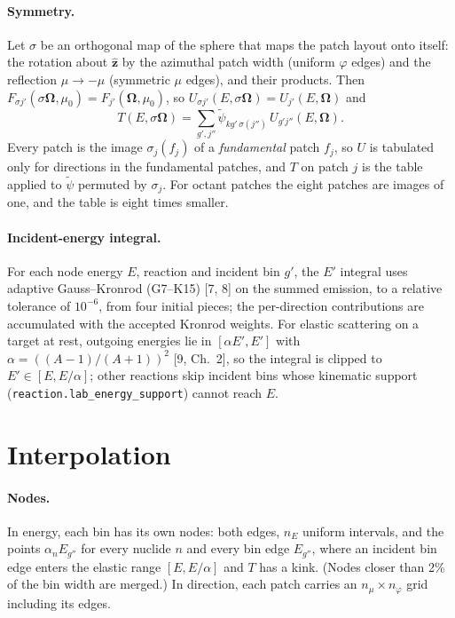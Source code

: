 \documentclass[11pt]{article}
\newcommand{\tpsi}{\tilde\psi}
\newcommand{\Om}{\boldsymbol\Omega}
\begin{document}
\paragraph{Symmetry.} Let $\sigma$ be an orthogonal map of the sphere that maps the
patch layout onto itself: the rotation about $\hat{\mathbf z}$ by the azimuthal patch
width (uniform $\varphi$ edges) and the reflection $\mu\to-\mu$ (symmetric $\mu$
edges), and their products. Then $F_{\sigma j'}(\sigma\Om,\mu_0) = F_{j'}(\Om,\mu_0)$,
so $U_{\sigma j'}(E,\sigma\Om) = U_{j'}(E,\Om)$ and
\begin{equation}
  T(E,\sigma\Om) = \sum_{g',j''} \tpsi_{kg'\,\sigma(j'')}\, U_{g'j''}(E,\Om).
\end{equation}
Every patch is the image $\sigma_j(f_j)$ of a \emph{fundamental} patch $f_j$, so $U$
is tabulated only for directions in the fundamental patches, and $T$ on patch $j$ is
the table applied to $\tpsi$ permuted by $\sigma_j$. For octant patches the eight
patches are images of one, and the table is eight times smaller.

\paragraph{Incident-energy integral.} For each node energy $E$, reaction and incident
bin $g'$, the $E'$ integral uses adaptive Gauss--Kronrod (G7--K15) [7, 8] on the
summed emission, to a relative tolerance of $10^{-6}$, from four initial pieces;
the per-direction contributions are accumulated with the accepted Kronrod weights.
For elastic scattering on a target at rest, outgoing energies lie in $[\alpha E',E']$
with $\alpha = ((A-1)/(A+1))^2$ [9, Ch.~2], so the integral is clipped to
$E'\in[E, E/\alpha]$; other reactions skip incident bins whose kinematic support
(\texttt{reaction.lab\_energy\_support}) cannot reach $E$.

\section{Interpolation}

\paragraph{Nodes.} In energy, each bin has its own nodes: both edges, $n_E$ uniform
intervals, and the points $\alpha_n E_{g''}$ for every nuclide $n$ and every bin edge
$E_{g''}$, where an incident bin edge enters the elastic range $[E,E/\alpha]$ and $T$
has a kink. (Nodes closer than 2\% of the bin width are merged.) In direction, each
patch carries an $n_\mu\times n_\varphi$ grid including its edges.
\end{document}
